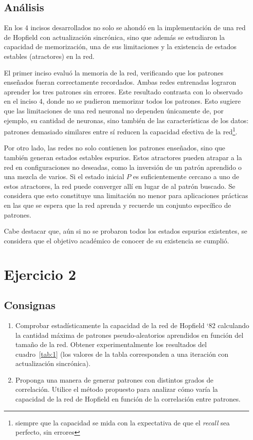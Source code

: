\documentclass[11pt]{article} %
\begin{document}
\clearpage
\newpage

\subsection{Análisis}

En los 4 incisos desarrollados no solo se ahondó en la implementación de una red de Hopfield con actualización sincrónica, sino que además se estudiaron la capacidad de memorización, una de sus limitaciones y la existencia de estados estables (atractores) en la red. 

El primer inciso evaluó la memoria de la red, verificando que los patrones enseñados fueran correctamente recordados. Ambas redes entrenadas lograron aprender los tres patrones  sin errores. Este resultado contrasta con lo observado en el inciso 4, donde no se pudieron memorizar todos los patrones. Esto sugiere que las limitaciones de una red neuronal no dependen únicamente de, por ejemplo, su cantidad de neuronas, sino también de las características de los datos: patrones demasiado similares entre sí reducen la capacidad efectiva de la red\footnote{siempre que la capacidad se mida con la expectativa de que el \textit{recall} sea perfecto, sin errores}.

Por otro lado, las redes no solo contienen los patrones enseñados, sino que también generan estados estables espurios. Estos atractores pueden atrapar a la red en configuraciones no deseadas, como la inversión de un patrón aprendido o una mezcla de varios.   Si el estado inicial $P$ es suficientemente cercano a uno de estos atractores, la red puede converger allí en lugar de al patrón buscado. Se considera que esto constituye una limitación no menor para aplicaciones prácticas en las que se espera que la red aprenda y recuerde un conjunto específico de patrones. 

Cabe destacar que, aún si no se probaron todos los estados espurios existentes, se considera que el objetivo académico de conocer de su existencia se cumplió. 

\clearpage
\newpage

\section{Ejercicio 2}

\subsection{Consignas}
\begin{enumerate}[label=\alph*]
\item Comprobar estadísticamente la capacidad de la red de Hopfield ‘82 calculando la
cantidad máxima de patrones pseudo-aleatorios aprendidos en función del tamaño
de la red. Obtener experimentalmente los resultados del cuadro~\ref{tab:1} (los
valores de la tabla corresponden a una iteración con actualización sincrónica).
\item Proponga una manera de generar patrones con distintos grados de correlación.
Utilice el método propuesto para analizar cómo varía la capacidad de la red de
Hopfield en función de la correlación entre patrones.
\end{enumerate}
\end{document}
